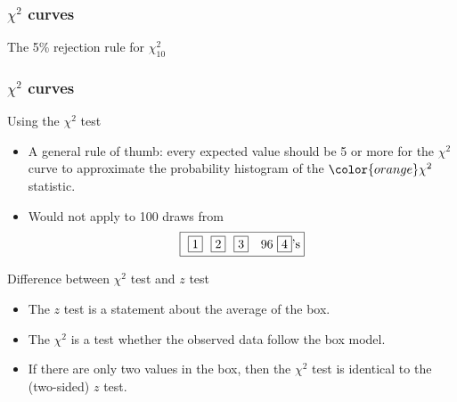 \documentclass[handout]{beamer}
\begin{document}


   \begin{frame}
   \frametitle{$\chi^2$ curves}
   \begin{center}
   \end{center}
   The 5\% rejection rule for $\chi^2_{10}$
   \end{frame}


   \begin{frame} \frametitle{$\chi^2$ curves}

   \begin{block}
   {Using the $\chi^2$ test}

   \begin{itemize}
   \item A general rule of thumb: every expected value should be 5 or more
   for the $\chi^2$ curve to approximate the probability
   histogram of the ${\color{orange} \chi^2}$ statistic.

   \item Would not apply to 100 draws from
     $$
       \fbox{ \fbox{1} \ \fbox{2} \  \fbox{3} \ \ 96 \fbox{4}'s}
     $$


   \end{itemize}
   \end{block}

   \begin{block}
     {Difference between $\chi^2$ test and $z$ test}
     \begin{itemize}
     \item The $z$ test is a statement about the average of the box.
     \item The $\chi^2$ is a test whether the  observed data follow the
     box model.
     \item If there are only two values in the box, then the
     $\chi^2$ test is identical to the (two-sided) $z$ test.
     \end{itemize}
   \end{block}
   \end{frame}
\end{document}
